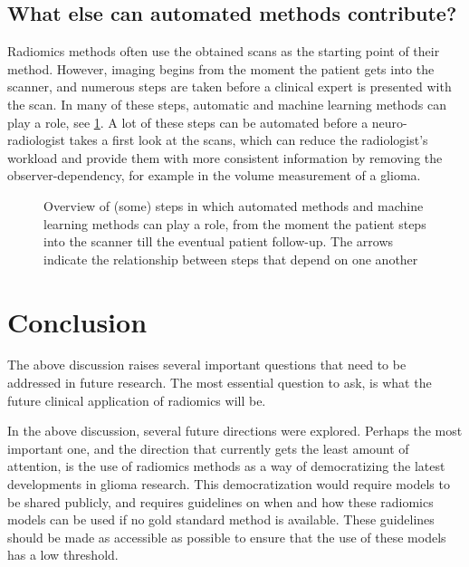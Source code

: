 \subsection{What else can automated methods contribute?}

Radiomics methods often use the obtained scans as the starting point of their method.
However, imaging begins from the moment the patient gets into the scanner, and numerous steps are taken before a clinical expert is presented with the scan.
In many of these steps, automatic and machine learning methods can play a role, see \cref{fig:discussion_pipeline_automatic}.
A lot of these steps can be automated before a neuro-radiologist takes a first look at the scans, which can reduce the radiologist's workload and provide them with more consistent information by removing the observer-dependency, for example in the volume measurement of a \gls{glioma}.

\begin{figure}[hbt]
    \centering
    \caption{Overview of (some) steps in which automated methods and machine learning methods can play a role, from the moment the patient steps into the scanner till the eventual patient follow-up. The arrows indicate the relationship between steps that depend on one another}\label{fig:discussion_pipeline_automatic}
\end{figure}


\section{Conclusion}\label{sec:discussion_conclusion}


The above discussion raises several important questions that need to be addressed in future research.
The most essential question to ask, is what the future clinical application of radiomics will be.

In the above discussion, several future directions were explored.
Perhaps the most important one, and the direction that currently gets the least amount of attention, is the use of radiomics methods as a way of democratizing the latest developments in glioma research.
This democratization would require models to be shared publicly, and requires guidelines on when and how these radiomics models can be used if no gold standard method is available.
These guidelines should be made as accessible as possible to ensure that the use of these models has a low threshold.

